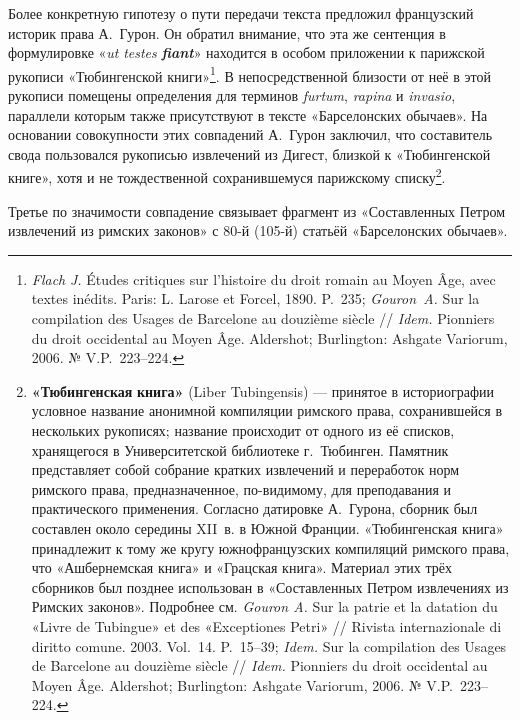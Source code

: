 Более конкретную гипотезу о пути передачи текста предложил французский историк права А.~Гурон. Он обратил внимание, что эта же сентенция в формулировке «\emph{ut }\emph{testes}\emph{ }\textbf{\emph{fiant}}» находится в особом приложении к парижской рукописи «Тюбингенской книги»\footnote{\emph{Flach }\emph{J. }Études critiques sur l’histoire du droit romain au Moyen Âge, avec textes inédits. Paris: L. Larose et Forcel, 1890. P.~235; \emph{Gouron~A. }Sur la compilation des Usages de Barcelone au douzième siècle //\emph{ Idem. }Pionniers du droit occidental au Moyen Âge. Aldershot; Burlington: Ashgate Variorum, 2006. № V.P.~223--224.}. В непосредственной близости от неё в этой рукописи помещены определения для терминов \emph{furtum}, \emph{rapina} и \emph{invasio}, параллели которым также присутствуют в тексте «Барселонских обычаев». На основании совокупности этих совпадений А.~Гурон заключил, что составитель свода пользовался рукописью извлечений из Дигест, близкой к «Тюбингенской книге», хотя и не тождественной сохранившемуся парижскому списку\footnote{\textbf{«}\textbf{Тюбингенская}\textbf{ книга» }(Liber Tubingensis) --- принятое в историографии условное название анонимной компиляции римского права, сохранившейся в нескольких рукописях; название происходит от одного из её списков, хранящегося в Университетской библиотеке г.~Тюбинген. Памятник представляет собой собрание кратких извлечений и переработок норм римского права, предназначенное, по-видимому, для преподавания и практического применения. Согласно датировке А.~Гурона, сборник был составлен около середины XII~в. в Южной Франции. «Тюбингенская книга» принадлежит к тому же кругу южнофранцузских компиляций римского права, что «Ашбернемская книга» и «Грацская книга». Материал этих трёх сборников был позднее использован в «Составленных Петром извлечениях из Римских законов». Подробнее см. \emph{Gouron A.} Sur la patrie et la datation du «Livre de Tubingue» et des «Exceptiones Petri» // Rivista internazionale di diritto comune. 2003. Vol.~14. P.~15--39; \emph{Idem.} Sur la compilation des Usages de Barcelone au douzième siècle // \emph{Idem.} Pionniers du droit occidental au Moyen Âge. Aldershot; Burlington: Ashgate Variorum, 2006. № V.P.~223--224.}.

Третье по значимости совпадение связывает фрагмент из «Составленных Петром извлечений из римских законов» с 80-й (105-й) статьёй «Барселонских обычаев».

